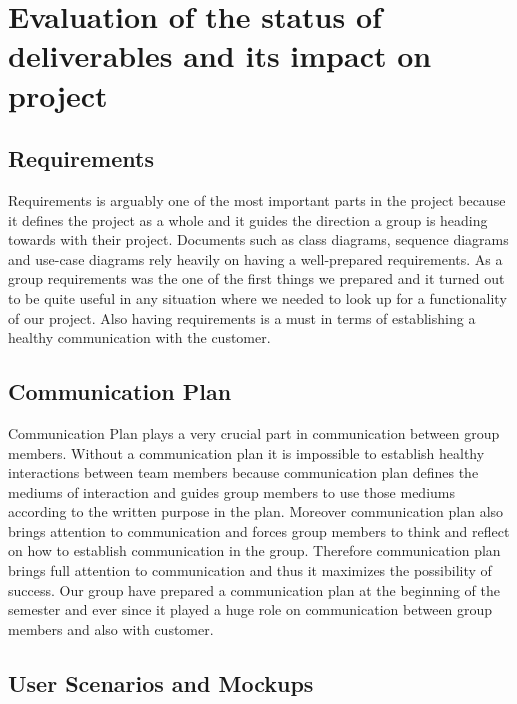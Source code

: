 \documentclass[]{article}
\begin{document}
\hypertarget{evaluation-of-the-status-of-deliverables-and-its-impact-on-project}{%
    \section{Evaluation of the status of deliverables and its impact on
      project}\label{evaluation-of-the-status-of-deliverables-and-its-impact-on-project}}

\hypertarget{requirements}{%
    \subsection{Requirements}\label{requirements}}

Requirements is arguably one of the most important parts in the project
because it defines the project as a whole and it guides the direction a
group is heading towards with their project. Documents such as class
diagrams, sequence diagrams and use-case diagrams rely heavily on having
a well-prepared requirements. As a group requirements was the one of the
first things we prepared and it turned out to be quite useful in any
situation where we needed to look up for a functionality of our project.
Also having requirements is a must in terms of establishing a healthy
communication with the customer.

\hypertarget{communication-plan}{%
    \subsection{Communication Plan}\label{communication-plan}}

Communication Plan plays a very crucial part in communication between
group members. Without a communication plan it is impossible to
establish healthy interactions between team members because
communication plan defines the mediums of interaction and guides group
members to use those mediums according to the written purpose in the
plan. Moreover communication plan also brings attention to communication
and forces group members to think and reflect on how to establish
communication in the group. Therefore communication plan brings full
attention to communication and thus it maximizes the possibility of
success. Our group have prepared a communication plan at the beginning
of the semester and ever since it played a huge role on communication
between group members and also with customer.

\hypertarget{user-scenarios-and-mockups}{%
    \subsection{User Scenarios and
        Mockups}\label{user-scenarios-and-mockups}}
\end{document}
